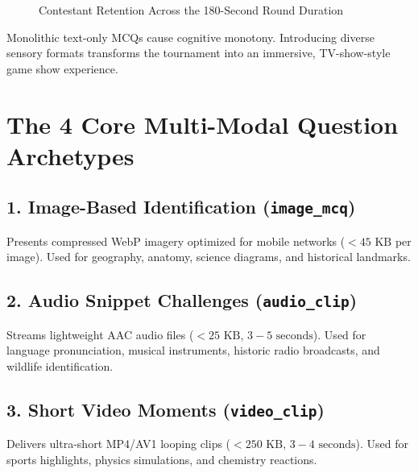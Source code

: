 \begin{figure}[htbp]
\centering
{}
\caption{Contestant Retention Across the 180-Second Round Duration}
\end{figure}

Monolithic text-only MCQs cause cognitive monotony. Introducing diverse sensory formats transforms the tournament into an immersive, TV-show-style game show experience.

\section{The 4 Core Multi-Modal Question Archetypes}

\subsection{1. Image-Based Identification (\texttt{image\_mcq})}
Presents compressed WebP imagery optimized for mobile networks ($< 45\text{ KB}$ per image). Used for geography, anatomy, science diagrams, and historical landmarks.

\subsection{2. Audio Snippet Challenges (\texttt{audio\_clip})}
Streams lightweight AAC audio files ($< 25\text{ KB}$, $3-5\text{ seconds}$). Used for language pronunciation, musical instruments, historic radio broadcasts, and wildlife identification.

\subsection{3. Short Video Moments (\texttt{video\_clip})}
Delivers ultra-short MP4/AV1 looping clips ($< 250\text{ KB}$, $3-4\text{ seconds}$). Used for sports highlights, physics simulations, and chemistry reactions.

